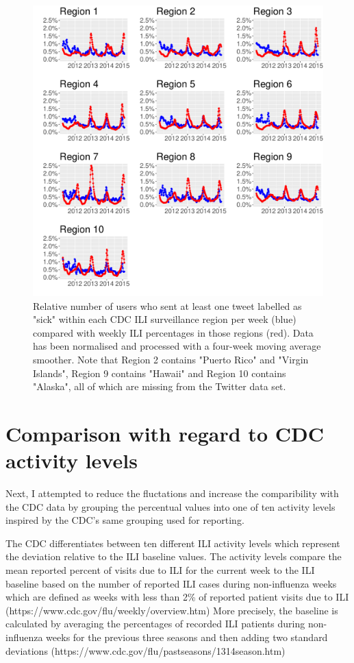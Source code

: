 \documentclass[11pt, a4paper]{report}\usepackage[]{graphicx}\usepackage[]{color}
\begin{document}
\begin{figure}[h]
\centering
\includegraphics[width=1\linewidth]{cdc_twitter_comp_regs_ma4_user.pdf}
\caption{Relative number of users who sent at least one tweet labelled as "sick" within each CDC ILI surveillance region per week (blue) compared with weekly ILI percentages in those regions (red). Data has been normalised and processed with a four-week moving average smoother. Note that Region 2 contains "Puerto Rico" and "Virgin Islands", Region 9 contains "Hawaii" and Region 10 contains "Alaska", all of which are missing from the Twitter data set.}
\label{fig:cdc_tw_comp_regs_ma4}
\end{figure}

\section{Comparison with regard to CDC activity levels}
Next, I attempted to reduce the fluctations and increase the comparibility with the CDC data by grouping the percentual values into one of ten activity levels inspired by the CDC's same grouping used for reporting.\newline

The CDC differentiates between ten different ILI activity levels which represent the deviation relative to the ILI baseline values. The activity levels compare the mean reported percent of visits due to ILI for the current week to the ILI baseline based on the number of reported ILI cases during non-influenza weeks which are defined as weeks with less than 2\% of reported patient visits due to ILI (https://www.cdc.gov/flu/weekly/overview.htm) More precisely, the baseline is calculated by averaging the percentages of recorded ILI patients during non-influenza weeks for the previous three seasons and then adding two standard deviations (https://www.cdc.gov/flu/pastseasons/1314season.htm)
\end{document}
